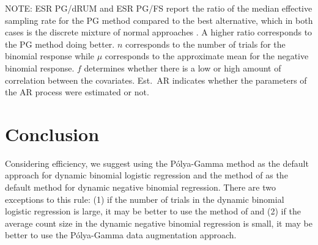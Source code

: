 \documentclass[12pt]{article}
\newcommand{\Polya}{P\'{o}lya}
\begin{document}
\begin{table}
  NOTE: ESR PG/dRUM and ESR PG/FS report the ratio of the median effective
  sampling rate for the PG method compared to the best alternative, which in both
  cases is the discrete mixture of normal approaches \citep{fussl-etal-2013,
    fruhwirth-schnatter-etal-2009}.  A higher ratio corresponds to the PG method
  doing better.  $n$ corresponds to the number of trials for the binomial response
  while $\mu$ corresponds to the approximate mean for the negative binomial
  response.  $f$ determines whether there is a low or high amount of correlation
  between the covariates.  Est.\ AR indicates whether the parameters of the AR
  process were estimated or not.

\end{table}

\section{Conclusion}

Considering efficiency, we suggest using the \Polya-Gamma method as the default
approach for dynamic binomial logistic regression and the method of
\cite{fruhwirth-schnatter-etal-2009} as the default method for dynamic negative
binomial regression.  There are two exceptions to this rule: (1) if the number
of trials in the dynamic binomial logistic regression is large, it may be better
to use the method of \cite{fussl-etal-2013} and (2) if the average count size in
the dynamic negative binomial regression is small, it may be better to use the
\Polya-Gamma data augmentation approach.
\end{document}
